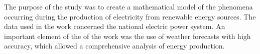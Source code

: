 The purpose of the study was to create a mathematical model of the phenomena occurring during the production of electricity
from renewable energy sources. The data used in the work concerned the national electric power system. An important element of the 
of the work was the use of weather forecasts with high accuracy, which allowed a comprehensive analysis of energy production.